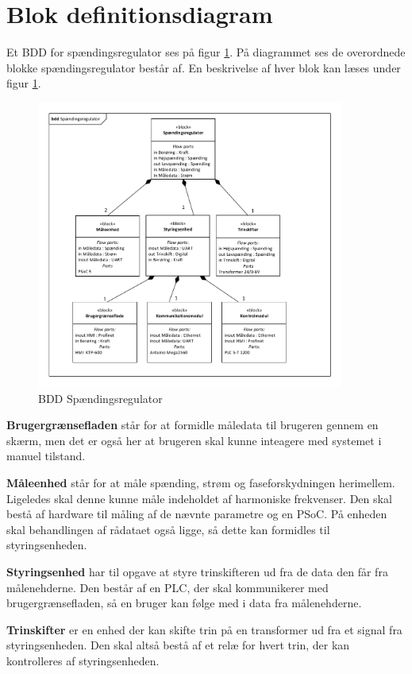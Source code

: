 
\section{Blok definitionsdiagram}
Et BDD for spændingsregulator ses på figur \ref{fig:BDDSpaendingsregulator}. På diagrammet ses de overordnede blokke spændingsregulator består af. En beskrivelse af hver blok kan læses under figur \ref{fig:BDDSpaendingsregulator}.

\begin{figure}[htbp] %
	\centering
	\includegraphics[width=0.9\textwidth]{Figure/BDDSpaendingsregulator}
	\caption{BDD Spændingsregulator}
	\label{fig:BDDSpaendingsregulator}
\end{figure}

\textbf{Brugergrænsefladen} står for at formidle måledata til brugeren gennem en skærm, men det er også her at brugeren skal kunne inteagere med systemet i manuel tilstand.

\textbf{Måleenhed} står for at måle spænding, strøm og faseforskydningen herimellem. Ligeledes skal denne kunne måle indeholdet af harmoniske frekvenser. Den skal bestå af hardware til måling af de nævnte parametre og en PSoC. På enheden skal behandlingen af rådataet også ligge, så dette kan formidles til styringsenheden.

\textbf{Styringsenhed} har til opgave at styre trinskifteren ud fra de data den får fra målenehderne. Den består af en PLC, der skal kommunikerer med brugergrænsefladen, så en bruger kan følge med i data fra målenehderne.

\textbf{Trinskifter} er en enhed der kan skifte trin på en transformer ud fra et signal fra styringsenheden. Den skal altså bestå af et relæ for hvert trin, der kan kontrolleres af styringsenheden.
